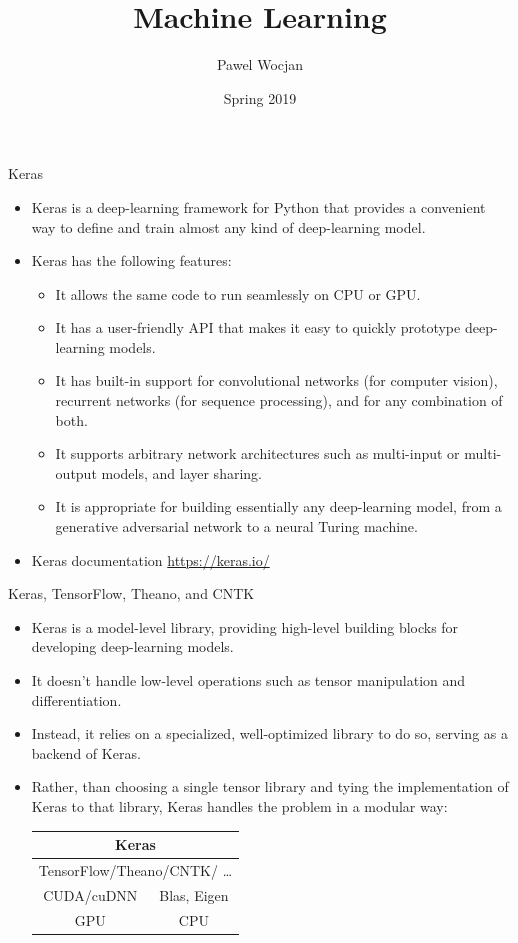 \documentclass{beamer}
\title[ML]{Machine Learning}
\author{Pawel Wocjan}
\institute{University of Central Florida}
\date{Spring 2019}
\begin{document}
\begin{frame}
  \titlepage
\end{frame}


\begin{frame}{Keras}
\begin{itemize}
\item Keras is a deep-learning framework for Python that provides a convenient way to define and train almost any kind of deep-learning model.
\item Keras has the following features:
\begin{itemize}
\item It allows the same code to run seamlessly on CPU or GPU.
\item It has a user-friendly API that makes it easy to quickly prototype deep-learning models.
\item It has built-in support for convolutional networks (for computer vision), recurrent networks (for sequence processing), and for any combination of both.
\item It supports arbitrary network architectures such as multi-input or multi-output models, and layer sharing. 
\item It is appropriate for building essentially any deep-learning model, from a generative adversarial network to a neural Turing machine.
\end{itemize}
\item Keras documentation \url{https://keras.io/}
\end{itemize}
\end{frame}

\begin{frame}{Keras, TensorFlow, Theano, and CNTK}

\begin{itemize}
\item Keras is a model-level library, providing high-level building blocks for developing deep-learning models.
\item It doesn't handle low-level operations such as tensor manipulation and differentiation. 
\item Instead, it relies on a specialized, well-optimized library to do so, serving as a backend of Keras.
\item Rather, than choosing a single tensor library and tying the implementation of Keras to that library, Keras handles the problem in a modular way:

\medskip
\begin{tabular}{|c|c|}
\hline
\multicolumn{2}{|c|}{Keras} \\ \hline
\multicolumn{2}{|c|}{TensorFlow/Theano/CNTK/ \ldots} \\ \hline
CUDA/cuDNN & Blas, Eigen \\ \hline
GPU & CPU \\ \hline
\end{tabular}
\end{itemize}
\end{frame}
\end{document}
